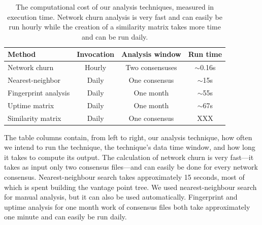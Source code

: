 \begin{table}[t]
	\centering
	\begin{tabular}{lccc}
	\textbf{Method} & \textbf{Invocation} & \textbf{Analysis window} & \textbf{Run time} \\
	\hline
	Network churn & Hourly & Two consensuses & $\sim$0.16s \\
	Nearest-neighbor & Daily & One consensus & $\sim$15s \\
	Fingerprint analysis & Daily & One month & $\sim$55s \\
	Uptime matrix & Daily & One month & $\sim$67s \\
	Similarity matrix & Daily & One consensus & XXX \\
	\end{tabular}
	\caption{The computational cost of our analysis techniques, measured in
	execution time.  Network churn analysis is very fast and can easily be run
	hourly while the creation of a similarity matrix takes more time and can be
	run daily.}
	\label{tab:exp-deployment}
\end{table}

The table columns contain, from left to right, our analysis technique, how often
we intend to run the technique, the technique's data time window, and how long
it takes to compute its output.  The calculation of network churn is very
fast---it takes as input only two consensus files---and can easily be done for
every network consensus.  Nearest-neighbour search takes approximately 15
seconds, most of which is spent building the vantage point tree.  We used
nearest-neighbour search for manual analysis, but it can also be used
automatically.  Fingerprint and uptime analysis for one month work of consensus
files both take approximately one minute and can easily be run daily.
